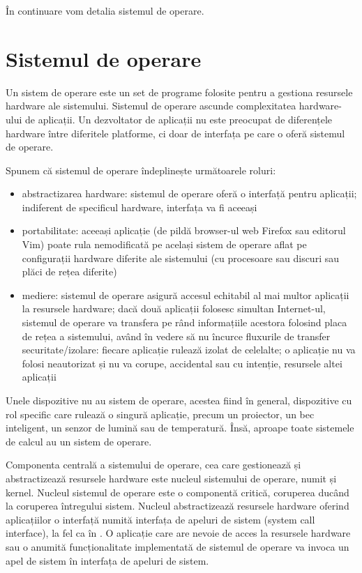 În continuare vom detalia sistemul de operare.

\section{Sistemul de operare}
\label{sec:intro:os}

Un sistem de operare este un set de programe folosite pentru a gestiona resursele hardware ale sistemului. Sistemul de operare ascunde complexitatea hardware-ului de aplicații. Un dezvoltator de aplicații nu este preocupat de diferențele hardware între diferitele platforme, ci doar de interfața pe care o oferă sistemul de operare.

Spunem că sistemul de operare îndeplinește următoarele roluri:

\begin{itemize}
  \item abstractizarea hardware: sistemul de operare oferă o interfață pentru aplicații; indiferent de specificul hardware, interfața va fi aceeași
  \item portabilitate: aceeași aplicație (de pildă browser-ul web Firefox sau editorul Vim) poate rula nemodificată pe același sistem de operare aflat pe configurații hardware diferite ale sistemului (cu procesoare sau discuri sau plăci de rețea diferite)
  \item mediere: sistemul de operare asigură accesul echitabil al mai multor aplicații la resursele hardware; dacă două aplicații folosesc simultan Internet-ul, sistemul de operare va transfera pe rând informațiile acestora folosind placa de rețea a sistemului, având în vedere să nu încurce fluxurile de transfer
securitate/izolare: fiecare aplicație rulează izolat de celelalte; o aplicație nu va folosi neautorizat și nu va corupe, accidental sau cu intenție, resursele altei aplicații
\end{itemize}

Unele dispozitive nu au sistem de operare, acestea fiind în general, dispozitive cu rol specific care rulează o singură aplicație, precum un proiector, un bec inteligent, un senzor de lumină sau de temperatură. Însă, aproape toate sistemele de calcul au un sistem de operare.

Componenta centrală a sistemului de operare, cea care gestionează și abstractizează resursele hardware este nucleul sistemului de operare, numit și kernel. Nucleul sistemul de operare este o componentă critică, coruperea ducând la coruperea întregului sistem. Nucleul abstractizează resursele hardware oferind aplicațiilor o interfață numită interfața de apeluri de sistem (system call interface), la fel ca în . O aplicație care are nevoie de acces la resursele hardware sau o anumită funcționalitate implementată de sistemul de operare va invoca un apel de sistem în interfața de apeluri de sistem.

